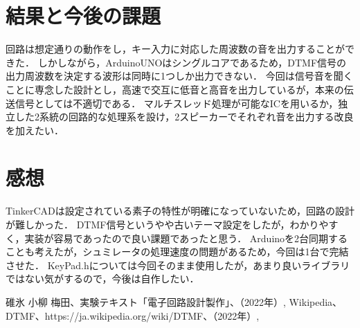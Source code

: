 \documentclass[dvipdfmx,titlepage,a4j]{jsarticle}  %
\begin{document}
\section{結果と今後の課題}
回路は想定通りの動作をし，キー入力に対応した周波数の音を出力することができた．
しかしながら，ArduinoUNOはシングルコアであるため，DTMF信号の出力周波数を決定する波形は同時に1つしか出力できない．
今回は信号音を聞くことに専念した設計とし，高速で交互に低音と高音を出力しているが，本来の伝送信号としては不適切である．
マルチスレッド処理が可能なICを用いるか，独立した2系統の回路的な処理系を設け，2スピーカーでそれぞれ音を出力する改良を加えたい．

\section{感想}
TinkerCADは設定されている素子の特性が明確になっていないため，回路の設計が難しかった．
DTMF信号というやや古いテーマ設定をしたが，わかりやすく，実装が容易であったので良い課題であったと思う．
Arduinoを2台同期することも考えたが，シュミレータの処理速度の問題があるため，今回は1台で完結させた．
KeyPad.hについては今回そのまま使用したが，あまり良いライブラリではない気がするので，今後は自作したい．

\begin{thebibliography}{99}
   碓氷 小柳 梅田、実験テキスト「電子回路設計製作」、（2022年）,
   Wikipedia、DTMF、https://ja.wikipedia.org/wiki/DTMF、（2022年）,
\end{thebibliography}
\end{document}
